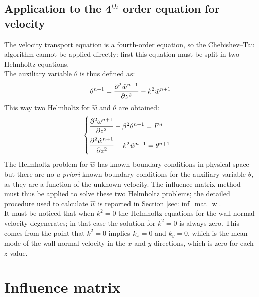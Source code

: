 \subsection{Application to the 4$^{th}$ order equation for velocity}
The velocity transport equation is a fourth-order equation, so the Chebishev--Tau algorithm cannot be applied directly: first this equation must be split in two Helmholtz equations.\\
The auxiliary variable $\theta$ is thus defined as:
\[
\theta^{n+1}=\frac{\partial^2\hat w^{n+1}}{\partial z^2}-k^2\hat w^{n+1}
\]
This way two Helmholtz for $\hat w$ and $\theta$ are obtained:
\[
\begin{cases}
\dfrac{\partial^2\omega^{n+1}}{\partial z^2}-\beta^2\theta^{n+1}=F^{n}\\[2ex]
\dfrac{\partial^2\hat w^{n+1}}{\partial z^2}-k^2\hat w^{n+1}=\theta^{n+1}
\end{cases}
\]
The Helmholtz problem for $\hat w$ has known boundary conditions in physical space but there are no \textit{a priori} known boundary conditions for the auxiliary variable $\theta$, as they are a function of the unknown velocity. The influence matrix method must thus be applied to solve these two Helmholtz problems; the detailed procedure used to calculate $\hat w$ is reported in Section \ref{sec: inf_mat_w}.\\
It must be noticed that when $k^2=0$ the Helmholtz equations for the wall-normal velocity degenerates; in that case the solution for $k^2=0$ is always zero. This comes from the point that $k^2=0$ implies $k_x=0$ and $k_y=0$, which is the mean mode of the wall-normal velocity in the $x$ and $y$ directions, which is zero for each $z$ value. 

\section{Influence matrix}
\label{sec: infl_matrix}

